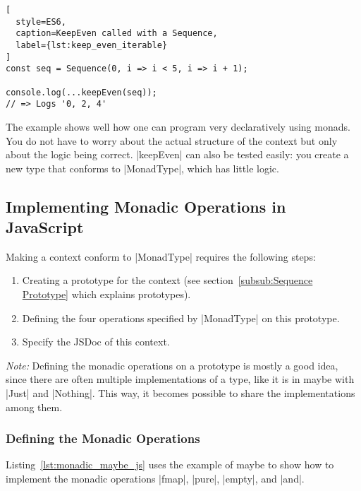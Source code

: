 \begin{lstlisting}[
  style=ES6,
  caption=KeepEven called with a Sequence,
  label={lst:keep_even_iterable}
]
const seq = Sequence(0, i => i < 5, i => i + 1);

console.log(...keepEven(seq));
// => Logs '0, 2, 4'
\end{lstlisting}
The example shows well how one can program very declaratively using monads. You
do not have to worry about the actual structure of the context but only about
the logic being correct.
|keepEven| can also be tested easily: you create a new type that conforms to
|MonadType|, which has little logic.


\subsection{Implementing Monadic Operations in JavaScript} %
\label{sub:Implementing Monadic Operations in JavaScript}
Making a context conform to |MonadType| requires the following steps:
\begin{enumerate}
  \item Creating a prototype for the context (see section~\ref{subsub:Sequence
    Prototype} which explains prototypes).
  \item Defining the four operations specified by |MonadType| on this
    prototype.
  \item Specify the JSDoc of this context.
\end{enumerate}

\textit{Note:} Defining the monadic operations on a prototype is mostly a good
idea, since there are often multiple implementations of a type, like it is in
maybe with |Just| and |Nothing|. This way, it becomes possible to share the
implementations among them.

\subsubsection{Defining the Monadic Operations} %
\label{subsub:Defining the Monadic Operations}
Listing~\ref{lst:monadic_maybe_js} uses the example of maybe to show how to
implement the monadic operations |fmap|, |pure|, |empty|, and |and|.

